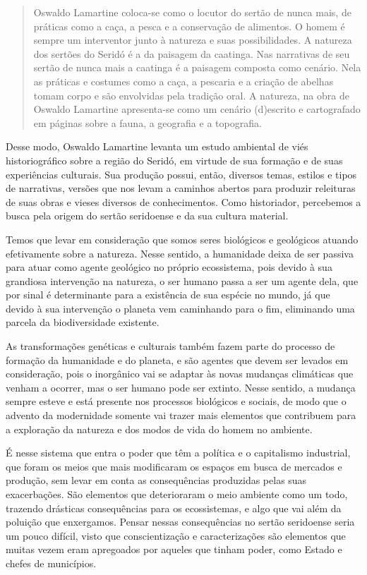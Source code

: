 \begin{refsection}
    \begin{quotation}
        Oswaldo Lamartine coloca-se como o locutor do sertão de nunca mais, de práticas como a caça, a pesca e a conservação de alimentos. O homem é sempre um interventor junto à natureza e suas possibilidades. A natureza dos sertões do Seridó é a da paisagem da caatinga. Nas narrativas de seu sertão de nunca mais a caatinga é a paisagem composta como cenário. Nela as práticas e costumes como a caça, a pescaria e a criação de abelhas tomam corpo e são envolvidas pela tradição oral. A natureza, na obra de Oswaldo Lamartine apresenta-se como um cenário (d)escrito e cartografado em páginas sobre a fauna, a geografia e a topografia.
    \end{quotation}

    Desse modo, Oswaldo Lamartine levanta um estudo ambiental de viés historiográfico sobre a região do Seridó, em virtude de sua formação e de suas experiências culturais. Sua produção possui, então, diversos temas, estilos e tipos de narrativas, versões que nos levam a caminhos abertos para produzir releituras de suas obras e vieses diversos de conhecimentos. Como historiador, percebemos a busca pela origem do sertão seridoense e da sua cultura material. 

    Temos que levar em consideração que somos seres biológicos e geológicos atuando efetivamente sobre a natureza. Nesse sentido, a humanidade deixa de ser passiva para atuar como agente geológico no próprio ecossistema, pois devido à sua grandiosa intervenção na natureza, o ser humano passa a ser um agente dela, que por sinal é determinante para a existência de sua espécie no mundo, já que devido à sua intervenção o planeta vem caminhando para o fim, eliminando uma parcela da biodiversidade existente.  

    As transformações genéticas e culturais também fazem parte do processo de formação da humanidade e do planeta, e são agentes que devem ser levados em consideração, pois o inorgânico vai se adaptar às novas mudanças climáticas que venham a ocorrer, mas o ser humano pode ser extinto. Nesse sentido, a mudança sempre esteve e está presente nos processos biológicos e sociais, de modo que o advento da modernidade somente vai trazer mais elementos que contribuem para a exploração da natureza e dos modos de vida do homem no ambiente.  

    É nesse sistema que entra o poder que têm a política e o capitalismo industrial, que foram os meios que mais modificaram os espaços em busca de mercados e produção, sem levar em conta as consequências produzidas pelas suas exacerbações. São elementos que deterioraram o meio ambiente como um todo, trazendo drásticas consequências para os ecossistemas, e algo que vai além da poluição que enxergamos. Pensar nessas consequências no sertão seridoense seria um pouco difícil, visto que conscientização e caracterizações são elementos que muitas vezem eram apregoados por aqueles que tinham poder, como Estado e chefes de municípios.  


\end{refsection}
